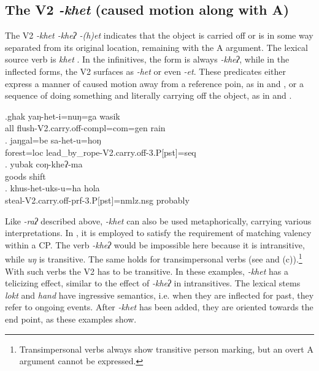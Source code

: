 \subsection{The V2 \emph{-khet} (caused motion along with A)}\label{V2-carryoff}%

The V2 \emph{-khet \ti -kheʔ \ti -(h)et} indicates that the  object is carried off or is in some way separated from its original location, remaining with the A argument. The lexical source verb is \emph{khet} . In the infinitives, the form is always \emph{-kheʔ}, while in the inflected forms, the V2 surfaces as \emph{-het} or even \emph{-et}.  These predicates either express a manner of caused motion away from a reference poin, as in \Next[a] and \Next[b], or a sequence of doing something and literally carrying off the object, as in  \Next[c] and \Next[d].


\exg.ghak yaŋ-het-i=nuŋ=ga  wasik\\
all flush{\sc -V2.carry.off-compl=com=gen} rain\\
 
\bg. jaŋgal=be sa-het-u=hoŋ\\
forest{\sc =loc} lead\_by\_rope{\sc -V2.carry.off-3.P[pst]=seq}\\
 
\bg. yubak coŋ-kheʔ-ma\\
goods shift\\
\bg. khus-het-uks-u=ha hola\\
steal{\sc -V2.carry.off-prf-3.P[pst]=nmlz.nsg} probably\\
 

Like \emph{-raʔ}  described above, \emph{-khet}  can also be used  metaphorically, carrying various interpretations. In  \Next[a], it is employed to satisfy the requirement of matching valency within a CP. The verb \emph{-kheʔ}  would be impossible here  because it is intransitive, while \emph{uŋ}  is transitive. The same holds for transimpersonal verbs (see \Next[b] and (c)).\footnote{Transimpersonal verbs always show  transitive person marking, but an overt A argument cannot be expressed.} With such verbs the V2 has to be transitive. In these examples, \emph{-khet} has a  telicizing effect, similar to the effect of \emph{-kheʔ}  in intransitives. The lexical stems \emph{lokt} and \emph{hand}  have ingressive semantics, i.e. when they are inflected for past, they refer to ongoing events. After \emph{-khet} has been added, they are oriented towards the end point, as these examples show.

